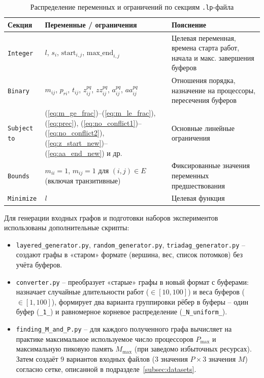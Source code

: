 \begin{table}[ht]
	\centering
	\small
	\setlength{\tabcolsep}{4pt}
	\caption{Распределение переменных и ограничений по секциям \texttt{.lp}-файла}
	\label{tab:lp_sections}
	\begin{tabular}{|l|p{3cm}|p{6cm}|}
		\hline
		\textbf{Секция} & \textbf{Переменные / ограничения} & \textbf{Пояснение} \\
		\hline
		\texttt{Integer} & $l$, $s_i$, $\text{start}_{i,j}$, $\text{max\_end}_{i,j}$ & Целевая переменная, времена старта работ, начала и макс. завершения буферов \\
		\hline
		\texttt{Binary} & $m_{ij}$, $p_{ri}$, $t_{ij}$, $z_{ij}^{pq}$, $zz_{ij}^{pq}$, $a_{ij}^{pq}$, $aa_{ij}^{pq}$ & Отношения порядка, назначение на процессоры, пересечения буферов \\
		\hline
		\texttt{Subject to} & (\ref{eq:m_ge_frac})--(\ref{eq:m_le_frac}), (\ref{eq:prec}), (\ref{eq:no_conflict1})--(\ref{eq:no_conflict2}), (\ref{eq:z_start_new})--(\ref{eq:aa_end_new}) и др. & Основные линейные ограничения \\
		\hline
		\texttt{Bounds} & $m_{ii}=1$, $m_{ij}=1$ для $(i,j)\in E$ (включая транзитивные) & Фиксированные значения переменных предшествования \\
		\hline
		\texttt{Minimize} & $l$ & Целевая функция \\
		\hline
	\end{tabular}
\end{table}

Для генерации входных графов и подготовки наборов экспериментов использованы дополнительные скрипты:
\begin{itemize}
	\item \texttt{layered\_generator.py}, \texttt{random\_generator.py}, \texttt{triadag\_generator.py} – создают графы в «старом» формате (вершина, вес, список потомков) без учёта буферов.
	\item \texttt{converter.py} – преобразует «старые» графы в новый формат с буферами: назначает случайные длительности работ ($\in[10,100]$) и веса буферов ($\in[1,100]$), формирует два варианта группировки рёбер в буферы – один буфер (\texttt{\_1\_}) и равномерное корневое распределение (\texttt{\_N\_uniform\_}).
	\item \texttt{finding\_M\_and\_P.py} – для каждого полученного графа вычисляет на практике максимальное используемое число процессоров $P_{\max}$ и максимальную пиковую память $M_{\max}$ (при заведомо избыточных ресурсах). Затем создаёт 9 вариантов входных файлов ($3$ значения $P \times 3$ значения $M$) согласно сетке, описанной в подразделе~\ref{subsec:datasets}.
\end{itemize}

